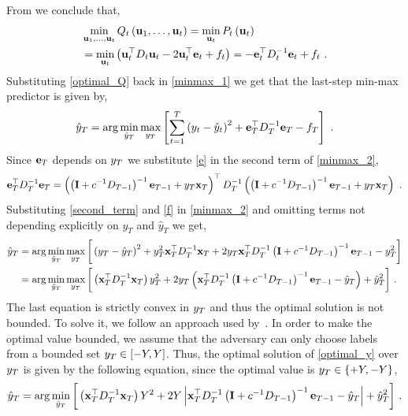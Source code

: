 From  we
conclude that,
\begin{align}
& \min_{\mathbf{u}_{1},\ldots,\mathbf{u}_{t}}Q_{t}\left(\mathbf{u}_{1},\ldots,\mathbf{u}_{t}\right)
=  \min_{\mathbf{u}_{t}}P_{t}\left(\mathbf{u}_{t}\right)\nonumber\\
& = \min_{\mathbf{u}_{t}}\left({\mathbf{u}}^{\top}_{t}D_{t}\mathbf{u}_{t}-2{\mathbf{u}}^{\top}_{t}\mathbf{e}_{t}+f_{t}\right)
= -\mathbf{e}^{\top}_{t}D_{t}^{-1}\mathbf{e}_{t}+f_{t}
 ~. \label{optimal_Q}
\end{align}
Substituting \eqref{optimal_Q} back in \eqref{minmax_1} we get that the last-step min-max
predictor is given by,
\begin{eqnarray}
\hat{y}_{T}=\arg\min_{\hat{y}_{T}}\max_{y_{T}}\left[\sum_{t=1}^{T}\left(y_{t}-\hat{y}_{t}\right)^{2}+\mathbf{e}^{\top}_{T}D_{T}^{-1}\mathbf{e}_{T}-f_{T}\right]
~. \label{minmax_2}
\end{eqnarray}
Since $\mathbf{e}_{T}$ depends on
$y_{T} $ we substitute \eqref{e} in the second term
of \eqref{minmax_2}, %
\begin{align}
\mathbf{e}^{\top}_{T}D_{T}^{-1}\mathbf{e}_{T}=\left(\left(\mathbf{I}+c^{-1}D_{T-1}\right)^{-1}\mathbf{e}_{T-1}+y_{T}\mathbf{x}_{T}\right)^{\top}D_{T}^{-1}\left(\left(\mathbf{I}+c^{-1}D_{T-1}\right)^{-1}\mathbf{e}_{T-1}+y_{T}\mathbf{x}_{T}\right) ~.\label{second_term}
\end{align}
Substituting \eqref{second_term} and \eqref{f} in \eqref{minmax_2} and
omitting terms not depending explicitly on $y_{T}$ and $\hat{y}_{T}$
we get,
\begin{align}
\hat{y}_T
&= \arg\min_{\hat{y}_{T}}\max_{y_{T}}\bigg[\left(y_{T}-\hat{y}_{T}\right)^{2}  + y_{T}^{2}{\mathbf{x}}^{\top}_{T}D_{T}^{-1}\mathbf{x}_{T}+2y_{T}{\mathbf{x}}^{\top}_{T}D_{T}^{-1}\left(\mathbf{I}+c^{-1}D_{T-1}\right)^{-1}\mathbf{e}_{T-1}-y_{T}^{2}\bigg]\nonumber\\
&=\arg\min_{\hat{y}_{T}}\max_{y_{T}}
\bigg[\left({\mathbf{x}}^{\top}_{T}D_{T}^{-1}\mathbf{x}_{T}\right)y_{T}^{2}+2y_{T}\left({\mathbf{x}}^{\top}_{T}D_{T}^{-1}\left(\mathbf{I}+c^{-1}D_{T-1}\right)^{-1}\mathbf{e}_{T-1}-\hat{y}_{T}\right)+\hat{y}_{T}^{2}\bigg]~.
\label{optimal_y}
\end{align}
The last equation is strictly convex in $y_{T}$ and thus the optimal
solution is not bounded. To solve it, we follow an approach used by~\cite{Forster}. In order to make the optimal
value bounded, we assume that the adversary can only
choose labels from a bounded set $y_{T}\in[-Y,Y]$. Thus, the optimal
solution of \eqref{optimal_y} over $y_{T}$ is given by the following
equation, since the optimal value is $y_{T}\in\{+Y,-Y\}$,
\begin{align*}
\hat{y}_T
=\arg\min_{\hat{y}_{T}}\bigg[\left({\mathbf{x}}^{\top}_{T}D_{T}^{-1}\mathbf{x}_{T}\right)
  Y^2  +2 Y\left\vert
  {\mathbf{x}}^{\top}_{T}D_{T}^{-1}\left(\mathbf{I}+c^{-1}D_{T-1}\right)^{-1}\mathbf{e}_{T-1}-\hat{y}_{T}\right\vert+\hat{y}_{T}^{2}\bigg]~.
\end{align*}
